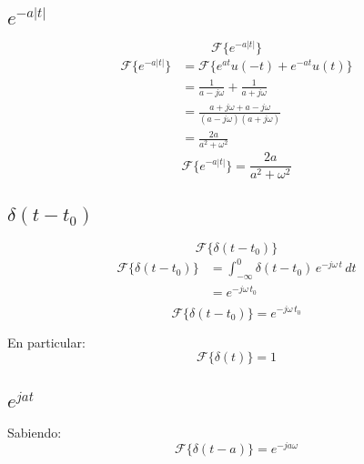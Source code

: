 \subsection{$e^{-a|t|}$}
\begin{equation*}
    \mathcal{F}\{e^{-a|t|}\}
\end{equation*}
\begin{equation*}
\begin{split}
    \mathcal{F}\{e^{-a|t|}\}
        &=\mathcal{F}\{e^{at}u(-t)+e^{-at}u(t)\}\\
        &=\frac{1}{a-j\omega}+\frac{1}{a+j\omega}\\
        &=\frac{a+j\omega+a-j\omega}{(a-j\omega)(a+j\omega)}\\
        &=\frac{2a}{a^2+\omega^2}
\end{split}
\end{equation*}
\begin{equation}
    \mathcal{F}\{e^{-a|t|}\}=\frac{2a}{a^2+\omega^2}
\end{equation}

\subsection{$\delta(t-t_0)$}
\begin{equation*}
    \mathcal{F}\{\delta(t-t_0)\}
\end{equation*}
\begin{equation*}
\begin{split}
    \mathcal{F}\{\delta(t-t_0)\}
        &=\int_{-\infty}^0\delta(t-t_0)\,e^{-j\omega\,t}\,dt\\
        &=e^{-j\omega\,t_0}\\
\end{split}
\end{equation*}
\begin{equation}
    \mathcal{F}\{\delta(t-t_0)\}=e^{-j\omega\,t_0}
\end{equation}

En particular:
\begin{equation*}
    \mathcal{F}\{\delta(t)\}=1
\end{equation*}

\subsection{$e^{jat}$}
Sabiendo:
\begin{equation*}
    \mathcal{F}\{\delta(t-a)\}=e^{-ja\omega}
\end{equation*}

